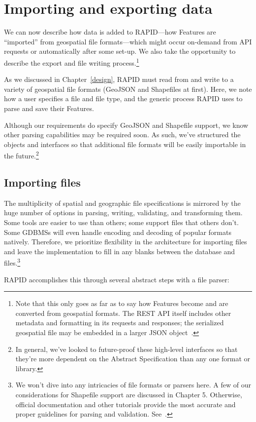 \section{Importing and exporting data}
We can now describe how data is added to RAPID---how Features are ``imported'' from geospatial file formats---which might occur on-demand from API requests or automatically after some set-up. We also take the opportunity to describe the export and file writing process.\footnote{Note that this only goes as far as to say how Features become and are converted from geospatial formats. The REST API itself includes other metadata and formatting in its requests and responses; the serialized geospatial file may be embedded in a larger JSON object~\cite{}.}

As we discussed in Chapter~\ref{design}, RAPID must read from and write to a variety of geospatial file formats (GeoJSON and Shapefiles at first). Here, we note how a user specifies a file and file type, and the generic process RAPID uses to parse and save their Features.

Although our requirements do specify GeoJSON and Shapefile support, we know other parsing capabilities may be required soon. As such, we've structured the objects and interfaces so that additional file formats will be easily importable in the future.\footnote{In general, we've looked to future-proof these high-level interfaces so that they're more dependent on the Abstract Specification than any one format or library.}

\subsection{Importing files}
The multiplicity of spatial and geographic file specifications is mirrored by the huge number of options in parsing, writing, validating, and transforming them. Some tools are easier to use than others; some support files that others don't. Some GDBMSs will even handle encoding and decoding of popular formats natively. Therefore, we prioritize flexibility in the architecture for importing files and leave the implementation to fill in any blanks between the database and files.\footnote{We won't dive into any intricacies of file formats or parsers here. A few of our considerations for Shapefile support are discussed in Chapter 5. Otherwise, official documentation and other tutorials provide the most accurate and proper guidelines for parsing and validation. See~\cite{}.}

RAPID accomplishes this through several abstract steps with a file parser:

